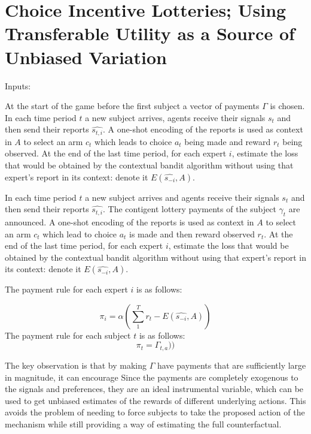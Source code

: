 
\section{Choice Incentive Lotteries;  Using Transferable Utility as a Source of Unbiased Variation}


\begin{mech}
Inputs:
 
At the start of the game before the first subject a vector of payments $\Gamma$ is chosen.
In each time period $t$ a new subject arrives, agents receive their signals $s_t$ and then send their reports $\hat{s_{t,i}}$. A one-shot encoding of the reports is used as context in $A$ to select an arm $c_t$ which leads to choice $a_t$ being made and reward $r_t$ being observed.
At the end of the last time period, for each expert $i$, estimate the loss that would be obtained by the contextual bandit algorithm without using that expert's report in its context: denote it $E(\hat{s_{-i}},A)$.


In each time period $t$ a new subject arrives and agents receive their signals $s_t$ and then send their reports $\hat{s_{t,i}}$. The contigent lottery payments of the subject $\gamma_t$ are announced. A one-shot encoding of the reports is used as context in $A$ to select an arm $c_t$ which lead to choice $a_t$ is made and then reward observed $r_t$.
At the end of the last time period, for each expert $i$, estimate the loss that would be obtained by the contextual bandit algorithm without using that expert's report in its context: denote it $E(\hat{s_{-i}},A)$.

The payment rule for each expert $i$ is as follows:

\[
    \pi_i =  \alpha (\sum_1^T r_t -  E(\hat{s_{-i}},A))
\]
The payment rule for each subject $t$ is as follows:
\[
    \pi_t =  \Gamma_{t,a}))
\]


\end{mech}

The key observation is that by making $\Gamma$ have payments that are sufficiently large in magnitude, it can encourage 
Since the payments are completely exogenous to the signals and preferences, they are an ideal instrumental variable, which can be used to get unbiased estimates of the rewards of different underlying actions.
This avoids the problem of needing to force subjects to take the proposed action of the mechanism while still providing a way of estimating the full counterfactual.

